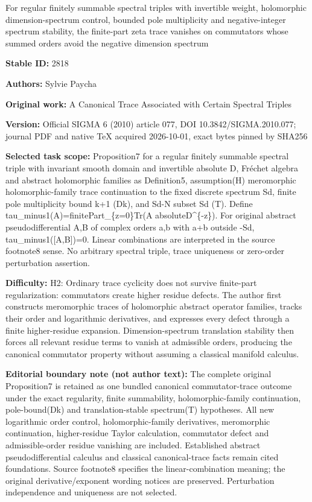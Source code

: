 \documentclass[11pt]{article}
\numberwithin{equation}{section}
\begin{document}
\begin{center}\Large For regular finitely summable spectral triples with invertible weight, holomorphic dimension-spectrum control, bounded pole multiplicity and negative-integer spectrum stability, the finite-part zeta trace vanishes on commutators whose summed orders avoid the negative dimension spectrum\end{center}
\noindent\textbf{Stable ID:} 2818\par
\noindent\textbf{Authors:} Sylvie Paycha\par
\noindent\textbf{Original work:} A Canonical Trace Associated with Certain Spectral Triples\par
\noindent\textbf{Version:} Official SIGMA 6 (2010) article 077, DOI 10.3842/SIGMA.2010.077; journal PDF and native TeX acquired 2026-10-01, exact bytes pinned by SHA256\par
\noindent\textbf{Selected task scope:} Proposition7 for a regular finitely summable spectral triple with invariant smooth domain and invertible absolute D, Fréchet algebra and abstract holomorphic families as Definition5, assumption(H) meromorphic holomorphic-family trace continuation to the fixed discrete spectrum Sd, finite pole multiplicity bound k+\allowbreak{}1 (Dk), and Sd-N subset Sd (T). Define tau\_minus1(A)=\allowbreak{}finitePart\_\{z=\allowbreak{}0\}Tr(A absoluteD\textasciicircum{}\{-z\}). For original abstract pseudodifferential A,B of complex orders a,b with a+\allowbreak{}b outside -Sd, tau\_minus1([A,B])=\allowbreak{}0. Linear combinations are interpreted in the source footnote8 sense. No arbitrary spectral triple, trace uniqueness or zero-order perturbation assertion.\par
\noindent\textbf{Difficulty:} H2: Ordinary trace cyclicity does not survive finite-part regularization: commutators create higher residue defects. The author first constructs meromorphic traces of holomorphic abstract operator families, tracks their order and logarithmic derivatives, and expresses every defect through a finite higher-residue expansion. Dimension-spectrum translation stability then forces all relevant residue terms to vanish at admissible orders, producing the canonical commutator property without assuming a classical manifold calculus.\par
\noindent\textbf{Editorial boundary note (not author text):} The complete original Proposition7 is retained as one bundled canonical commutator-trace outcome under the exact regularity, finite summability, holomorphic-family continuation, pole-bound(Dk) and translation-stable spectrum(T) hypotheses. All new logarithmic order control, holomorphic-family derivatives, meromorphic continuation, higher-residue Taylor calculation, commutator defect and admissible-order residue vanishing are included. Established abstract pseudodifferential calculus and classical canonical-trace facts remain cited foundations. Source footnote8 specifies the linear-combination meaning; the original derivative/exponent wording notices are preserved. Perturbation independence and uniqueness are not selected.\par
\end{document}
